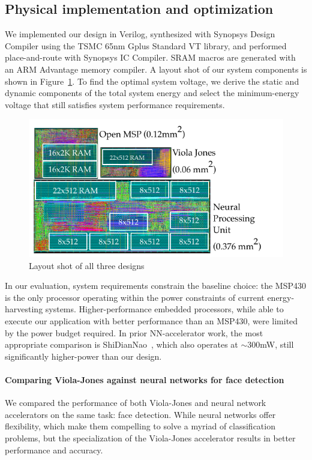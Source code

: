 \subsection{Physical implementation and optimization}

We implemented our design in Verilog, synthesized with Synopsys Design Compiler using the TSMC 65nm Gplus Standard VT library, and performed place-and-route with Synopsys IC Compiler. SRAM macros are generated with an ARM Advantage memory compiler. A layout shot of our system components is shown in Figure~\ref{fig:layout_shot}. To find the optimal system voltage, we derive the static and dynamic components of the total system energy and select the minimum-energy voltage that still satisfies system performance requirements.

\begin{figure}
\centering
    \begin{center}
      \includegraphics[width=1.2\textwidth]{nsp-figs/layout.pdf}
    \end{center}
    \caption{Layout shot of all three designs}
    \label{fig:layout_shot}
\end{figure}


In our evaluation, system requirements constrain the baseline choice: the MSP430 is the only processor operating within the power constraints of current energy-harvesting systems.
Higher-performance embedded processors, while able to execute our application with better performance than an MSP430, were limited by the power budget required.
In prior NN-accelerator work, the most appropriate comparison is ShiDianNao~\cite{shidiannao}, which also operates at $ \sim$300mW, still significantly higher-power than our design.

\paragraph{Comparing Viola-Jones against neural networks for face detection}
We compared the performance of both Viola-Jones and neural network accelerators
on the same task: face detection. While neural networks offer flexibility,
which make them compelling to solve a myriad of classification problems, but the
specialization of the Viola-Jones accelerator results in better performance and
accuracy.

